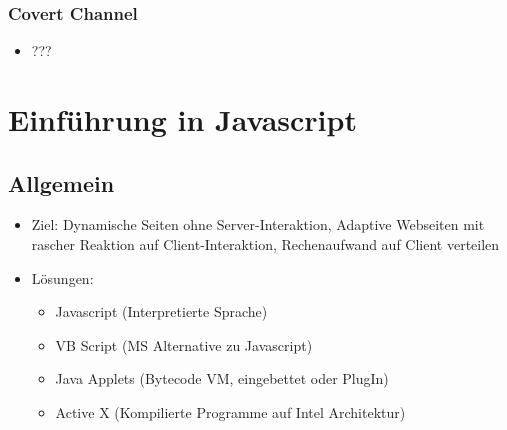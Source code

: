 \documentclass{article} %
\begin{document}
	\subsubsection{Covert Channel}
	\begin{itemize}
		\item ???
	\end{itemize}
	
	
	
	\section{Einführung in Javascript}
	\subsection{Allgemein}
	\begin{itemize}
		\item Ziel: Dynamische Seiten ohne Server-Interaktion, Adaptive Webseiten mit rascher Reaktion auf Client-Interaktion, Rechenaufwand auf Client verteilen
		\item Lösungen: 
		\begin{itemize}
			\item Javascript (Interpretierte Sprache)
			\item VB Script (MS Alternative zu Javascript)
			\item Java Applets (Bytecode VM, eingebettet oder PlugIn)
			\item Active X (Kompilierte Programme auf Intel Architektur)
		\end{itemize}
		

\end{itemize}
\end{document}
